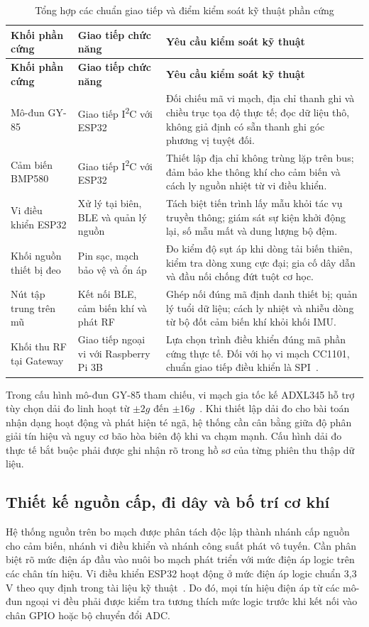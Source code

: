 \begingroup\SmallTable
\begin{longtable}{|P{75bp}|P{115bp}|P{218bp}|}
\caption{Tổng hợp các chuẩn giao tiếp và điểm kiểm soát kỹ thuật phần cứng}\label{tab:hardware}\\\hline
\textbf{Khối phần cứng}&\textbf{Giao tiếp chức năng}&\textbf{Yêu cầu kiểm soát kỹ thuật}\\\hline\endfirsthead
\hline\textbf{Khối phần cứng}&\textbf{Giao tiếp chức năng}&\textbf{Yêu cầu kiểm soát kỹ thuật}\\\hline\endhead
Mô-đun GY-85&Giao tiếp I\textsuperscript{2}C với ESP32&Đối chiếu mã vi mạch, địa chỉ thanh ghi và chiều trục tọa độ thực tế; đọc dữ liệu thô, không giả định có sẵn thanh ghi góc phương vị tuyệt đối.\\\hline
Cảm biến BMP580&Giao tiếp I\textsuperscript{2}C với ESP32&Thiết lập địa chỉ không trùng lặp trên bus; đảm bảo khe thông khí cho cảm biến và cách ly nguồn nhiệt từ vi điều khiển.\\\hline
Vi điều khiển ESP32&Xử lý tại biên, BLE và quản lý nguồn&Tách biệt tiến trình lấy mẫu khỏi tác vụ truyền thông; giám sát sự kiện khởi động lại, số mẫu mất và dung lượng bộ đệm.\\\hline
Khối nguồn thiết bị đeo&Pin sạc, mạch bảo vệ và ổn áp&Đo kiểm độ sụt áp khi dòng tải biến thiên, kiểm tra dòng xung cực đại; gia cố dây dẫn và đầu nối chống đứt tuột cơ học.\\\hline
Nút tập trung trên mũ&Kết nối BLE, cảm biến khí và phát RF&Ghép nối đúng mã định danh thiết bị; quản lý tuổi dữ liệu; cách ly nhiệt và nhiễu dòng từ bộ đốt cảm biến khí khỏi khối IMU.\\\hline
Khối thu RF tại Gateway&Giao tiếp ngoại vi với Raspberry Pi 3B&Lựa chọn trình điều khiển đúng mã phần cứng thực tế. Đối với họ vi mạch CC1101, chuẩn giao tiếp điều khiển là SPI~\cite{cc1101}.\\\hline
\end{longtable}\endgroup

Trong cấu hình mô-đun GY-85 tham chiếu, vi mạch gia tốc kế ADXL345 hỗ trợ tùy chọn dải đo linh hoạt từ $\pm2g$ đến $\pm16g$~\cite{adxl345}. Khi thiết lập dải đo cho bài toán nhận dạng hoạt động và phát hiện té ngã, hệ thống cần cân bằng giữa độ phân giải tín hiệu và nguy cơ bão hòa biên độ khi va chạm mạnh. Cấu hình dải đo thực tế bắt buộc phải được ghi nhận rõ trong hồ sơ của từng phiên thu thập dữ liệu.

\subsection{Thiết kế nguồn cấp, đi dây và bố trí cơ khí}
Hệ thống nguồn trên bo mạch được phân tách độc lập thành nhánh cấp nguồn cho cảm biến, nhánh vi điều khiển và nhánh công suất phát vô tuyến. Cần phân biệt rõ mức điện áp đầu vào nuôi bo mạch phát triển với mức điện áp logic trên các chân tín hiệu. Vi điều khiển ESP32 hoạt động ở mức điện áp logic chuẩn 3,3 V theo quy định trong tài liệu kỹ thuật~\cite{esp32}. Do đó, mọi tín hiệu điện áp từ các mô-đun ngoại vi đều phải được kiểm tra tương thích mức logic trước khi kết nối vào chân GPIO hoặc bộ chuyển đổi ADC.

